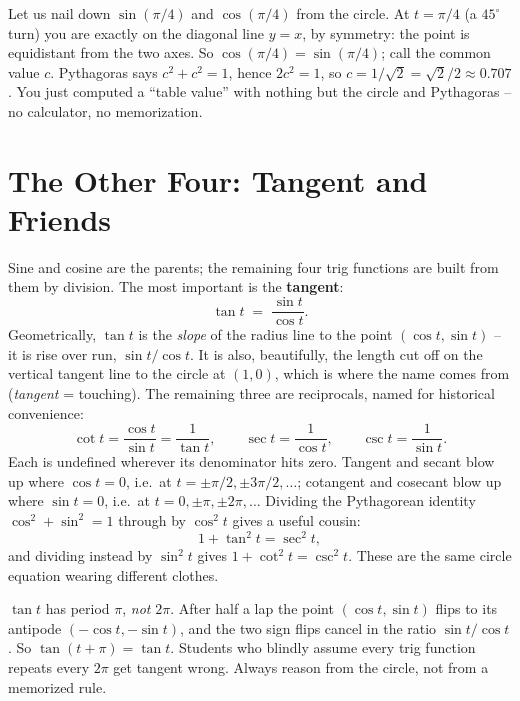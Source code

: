 \begin{labbox}
Let us nail down $\sin(\pi/4)$ and $\cos(\pi/4)$ from the circle. At $t = \pi/4$ (a $45^\circ$ turn) you are exactly on the diagonal line $y = x$, by symmetry: the point is equidistant from the two axes. So $\cos(\pi/4) = \sin(\pi/4)$; call the common value $c$. Pythagoras says $c^2 + c^2 = 1$, hence $2c^2 = 1$, so $c = 1/\sqrt2 = \sqrt2/2 \approx 0.707$. You just computed a ``table value'' with nothing but the circle and Pythagoras -- no calculator, no memorization.
\end{labbox}

\section{The Other Four: Tangent and Friends}
\label{ch04:tangent}

Sine and cosine are the parents; the remaining four trig functions are built from them by division. The most important is the \textbf{tangent}:
\[
  \tan t \;=\; \frac{\sin t}{\cos t}.
\]
Geometrically, $\tan t$ is the \emph{slope} of the radius line to the point $(\cos t,\sin t)$ -- it is rise over run, $\sin t / \cos t$. It is also, beautifully, the length cut off on the vertical tangent line to the circle at $(1,0)$, which is where the name comes from (\emph{tangent} = touching). The remaining three are reciprocals, named for historical convenience:
\[
  \cot t = \frac{\cos t}{\sin t} = \frac{1}{\tan t},\qquad
  \sec t = \frac{1}{\cos t},\qquad
  \csc t = \frac{1}{\sin t}.
\]
Each is undefined wherever its denominator hits zero. Tangent and secant blow up where $\cos t = 0$, i.e.\ at $t = \pm\pi/2, \pm 3\pi/2,\ldots$; cotangent and cosecant blow up where $\sin t = 0$, i.e.\ at $t = 0, \pm\pi, \pm 2\pi,\ldots$ Dividing the Pythagorean identity $\cos^2 + \sin^2 = 1$ through by $\cos^2 t$ gives a useful cousin:
\[
  1 + \tan^2 t = \sec^2 t,
\]
and dividing instead by $\sin^2 t$ gives $1 + \cot^2 t = \csc^2 t$. These are the same circle equation wearing different clothes.

\begin{trapbox}
$\tan t$ has period $\pi$, \emph{not} $2\pi$. After half a lap the point $(\cos t,\sin t)$ flips to its antipode $(-\cos t, -\sin t)$, and the two sign flips cancel in the ratio $\sin t/\cos t$. So $\tan(t+\pi) = \tan t$. Students who blindly assume every trig function repeats every $2\pi$ get tangent wrong. Always reason from the circle, not from a memorized rule.
\end{trapbox}

